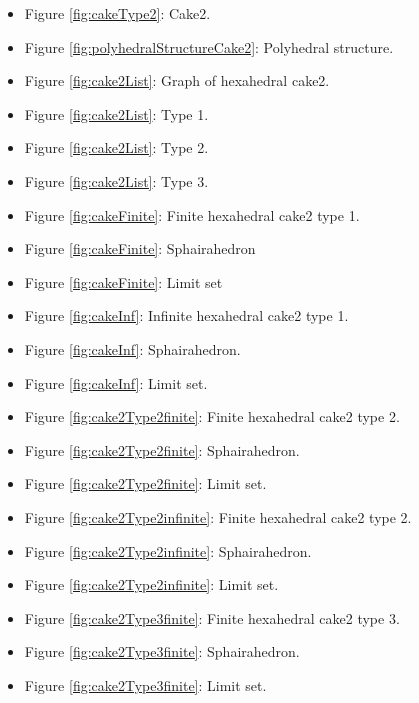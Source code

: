 \documentclass[suppldata, dvipdfmx]{interact}
\theoremstyle{plain}%
\theoremstyle{definition}
\theoremstyle{remark}
\theoremstyle{problemstyle}
\begin{document}
\begin{itemize}
\item Figure \ref{fig:cakeType2}: Cake2.
\item Figure \ref{fig:polyhedralStructureCake2}: Polyhedral structure.
\item Figure \ref{fig:cake2List}: Graph of hexahedral cake2.
\item Figure \ref{fig:cake2List}: Type 1.
\item Figure \ref{fig:cake2List}: Type 2.
\item Figure \ref{fig:cake2List}: Type 3.

\item Figure \ref{fig:cakeFinite}: Finite hexahedral cake2 type 1.
\item Figure \ref{fig:cakeFinite}:
      Sphairahedron 
\item Figure \ref{fig:cakeFinite}: Limit
      set

\item Figure \ref{fig:cakeInf}: Infinite hexahedral cake2 type 1.
\item Figure \ref{fig:cakeInf}:
      Sphairahedron.
\item Figure \ref{fig:cakeInf}: Limit set.

\item Figure \ref{fig:cake2Type2finite}: Finite hexahedral cake2 type 2.
\item Figure
      \ref{fig:cake2Type2finite}:
      Sphairahedron.
\item Figure
      \ref{fig:cake2Type2finite}:
      Limit set.

\item Figure \ref{fig:cake2Type2infinite}: Finite hexahedral cake2 type
      2.
\item Figure
      \ref{fig:cake2Type2infinite}:
      Sphairahedron.
\item Figure \ref{fig:cake2Type2infinite}:
      Limit set.

\item Figure \ref{fig:cake2Type3finite}: Finite hexahedral cake2 type 3.
\item Figure
      \ref{fig:cake2Type3finite}:
      Sphairahedron.
\item Figure
      \ref{fig:cake2Type3finite}:
      Limit set.


\end{itemize}
\end{document}
